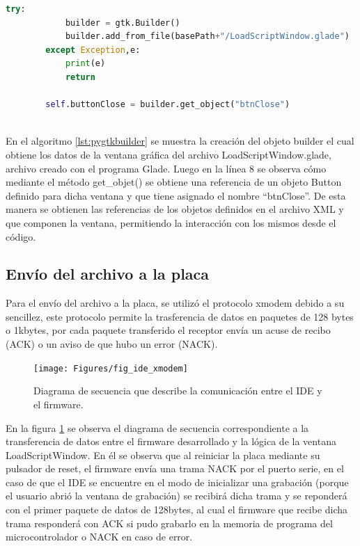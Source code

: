 \begin{lstlisting}[language={python},label={lst:pygtkbuilder},caption=Porción de código que muestra la creación de la ventana a partir del archivo glade] 
		try:
			builder = gtk.Builder()
			builder.add_from_file(basePath+"/LoadScriptWindow.glade")
		except Exception,e:
			print(e)
			return

		self.buttonClose = builder.get_object("btnClose")
		
\end{lstlisting}

En el algoritmo \ref{lst:pygtkbuilder} se muestra la creación del objeto builder el cual obtiene los datos de la ventana gráfica del archivo LoadScriptWindow.glade, archivo creado con el programa Glade. Luego en la línea 8 se observa cómo mediante el método get\_objet() se obtiene una referencia de un objeto Button definido para dicha ventana y que tiene asignado el nombre “btnClose”. De esta manera se obtienen las referencias de los objetos definidos en el archivo XML y que componen la ventana, permitiendo la interacción con los mismos desde el código.


\subsection{Envío del archivo a la placa}

Para el envío del archivo a la placa, se utilizó el protocolo xmodem debido a su sencillez, este protocolo permite la trasferencia de datos en paquetes de 128 bytes o 1kbytes, por cada paquete transferido el receptor envía un acuse de recibo (ACK) o un aviso de que hubo un error (NACK).

\begin{figure}[ht]
  \centering
    \texttt{[image: Figures/fig\_ide\_xmodem]}
  \caption{Diagrama de secuencia que describe la comunicación entre el IDE y el firmware.}
  \label{fig:secuencexmodem}
\end{figure}

En la figura \ref{fig:secuencexmodem} se observa el diagrama de secuencia correspondiente a la transferencia de datos entre el firmware desarrollado y la lógica de la ventana LoadScriptWindow.
En él se observa que al reiniciar la placa mediante su pulsador de reset, el firmware envía una trama NACK por el puerto serie, en el caso de que el IDE se encuentre en el modo de inicializar una grabación (porque el usuario abrió la ventana de grabación) se recibirá dicha trama y se reponderá con el primer paquete de datos de 128bytes, al cual el firmware que recibe dicha trama responderá con ACK si pudo grabarlo en la memoria de programa del microcontrolador o NACK en caso de error. 

